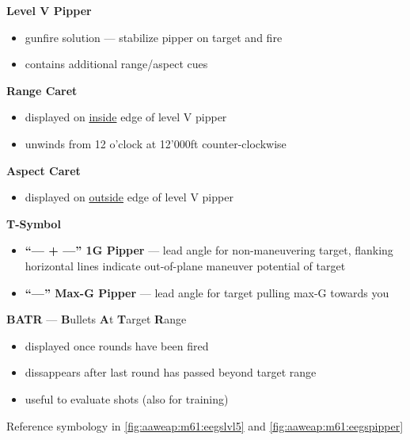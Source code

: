 \begin{tcoloritemize}
{    \begin{subitemize}
        \item \textbf{Level V Pipper}
        \begin{itemize}
            \item gunfire solution --- stabilize pipper on target and fire
            \item contains additional range/aspect cues
        \end{itemize}
        \item \textbf{Range Caret}
        \begin{itemize}
            \item displayed on \underline{inside} edge of level V pipper
            \item unwinds from 12 o'clock at 12'000ft counter-clockwise
        \end{itemize}
        \item \textbf{Aspect Caret} 
        \begin{itemize}
            \item displayed on \underline{outside} edge of level V pipper
        \end{itemize}
        \item \textbf{T-Symbol}
        \begin{itemize}
            \item \textbf{``--- + ---'' 1G Pipper} --- lead angle for non-maneuvering target,
            flanking horizontal lines indicate out-of-plane maneuver potential of target
            \item \textbf{``---'' Max-G Pipper} --- lead angle for target pulling max-G towards you
        \end{itemize}
        \item \textbf{BATR} --- \textbf{B}ullets \textbf{A}t \textbf{T}arget \textbf{R}ange
        \begin{itemize}
            \item displayed once rounds have been fired
            \item dissappears after last round has passed beyond target range
            \item useful to evaluate shots (also for training)
        \end{itemize}
    \end{subitemize}
    
    Reference symbology in \cref{fig:aaweap:m61:eegslvl5} and \cref{fig:aaweap:m61:eegspipper}
    }
\end{tcoloritemize}

